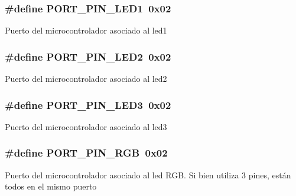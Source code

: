 \subsubsection[{\texorpdfstring{P\+O\+R\+T\+\_\+\+P\+I\+N\+\_\+\+L\+E\+D1}{PORT_PIN_LED1}}]{\setlength{\rightskip}{0pt plus 5cm}\#define P\+O\+R\+T\+\_\+\+P\+I\+N\+\_\+\+L\+E\+D1~0x02}\hypertarget{group__hardware_ga281151e2a661c8ad6893aee42b0024c4}{}\label{group__hardware_ga281151e2a661c8ad6893aee42b0024c4}
Puerto del microcontrolador asociado al led1 
\subsubsection[{\texorpdfstring{P\+O\+R\+T\+\_\+\+P\+I\+N\+\_\+\+L\+E\+D2}{PORT_PIN_LED2}}]{\setlength{\rightskip}{0pt plus 5cm}\#define P\+O\+R\+T\+\_\+\+P\+I\+N\+\_\+\+L\+E\+D2~0x02}\hypertarget{group__hardware_ga3039da47774de5edf9a11968103d87c5}{}\label{group__hardware_ga3039da47774de5edf9a11968103d87c5}
Puerto del microcontrolador asociado al led2 
\subsubsection[{\texorpdfstring{P\+O\+R\+T\+\_\+\+P\+I\+N\+\_\+\+L\+E\+D3}{PORT_PIN_LED3}}]{\setlength{\rightskip}{0pt plus 5cm}\#define P\+O\+R\+T\+\_\+\+P\+I\+N\+\_\+\+L\+E\+D3~0x02}\hypertarget{group__hardware_ga097e347296860c96d104ef8ab90dac33}{}\label{group__hardware_ga097e347296860c96d104ef8ab90dac33}
Puerto del microcontrolador asociado al led3 
\subsubsection[{\texorpdfstring{P\+O\+R\+T\+\_\+\+P\+I\+N\+\_\+\+R\+GB}{PORT_PIN_RGB}}]{\setlength{\rightskip}{0pt plus 5cm}\#define P\+O\+R\+T\+\_\+\+P\+I\+N\+\_\+\+R\+GB~0x02}\hypertarget{group__hardware_ga372c868d523a46916b874b4e3c5722f5}{}\label{group__hardware_ga372c868d523a46916b874b4e3c5722f5}
Puerto del microcontrolador asociado al led R\+GB. Si bien utiliza 3 pines, están todos en el mismo puerto 

